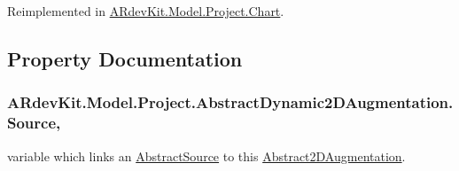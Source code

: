 Reimplemented in \hyperlink{class_a_rdev_kit_1_1_model_1_1_project_1_1_chart_aaa06b6e53f2e5a48508f3a93b0483dc3}{A\-Rdev\-Kit.\-Model.\-Project.\-Chart}.



\subsection{Property Documentation}
\hypertarget{class_a_rdev_kit_1_1_model_1_1_project_1_1_abstract_dynamic2_d_augmentation_a6abf4f1aff81779f1ec989c2cb99bdf3}{
\subsubsection[{Source}]{ A\-Rdev\-Kit.\-Model.\-Project.\-Abstract\-Dynamic2\-D\-Augmentation.\-Source\hspace{0.3cm}{\ttfamily [get]}, {\ttfamily [set]}}}\label{class_a_rdev_kit_1_1_model_1_1_project_1_1_abstract_dynamic2_d_augmentation_a6abf4f1aff81779f1ec989c2cb99bdf3}


variable which links an \hyperlink{class_a_rdev_kit_1_1_model_1_1_project_1_1_abstract_source}{Abstract\-Source} to this \hyperlink{class_a_rdev_kit_1_1_model_1_1_project_1_1_abstract2_d_augmentation}{Abstract2\-D\-Augmentation}. 

